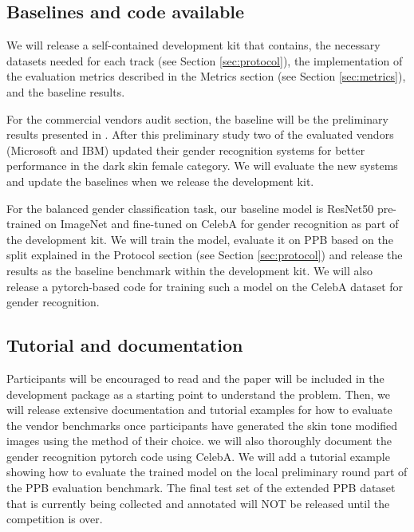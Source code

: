 \documentclass[11pt, oneside]{article}
\makeatletter
\let\@internalcite\cite
\def\cite{\def\citeauthoryear##1##2{##1, ##2}\@internalcite}
\makeatother
\begin{document}
\subsection{Baselines and code available}

We will release a self-contained development kit that contains, the necessary 
datasets needed for each track (see Section \ref{sec:protocol}), the 
implementation of the evaluation metrics described in the Metrics section (see 
Section \ref{sec:metrics}), and the baseline results.

For the commercial vendors audit section, the baseline will be the preliminary 
results presented in \cite{buolamwini2018gender}. After this preliminary study 
two of the evaluated vendors (Microsoft and IBM) updated their gender 
recognition systems for better performance in the dark skin female category. We 
will evaluate the new systems and update the baselines when we release the 
development kit.

For the balanced gender classification task, our baseline model is ResNet50 
pre-trained on ImageNet and fine-tuned on CelebA for gender recognition as part 
of the development kit. We will train the model, evaluate it on PPB based on 
the split explained in the Protocol section (see Section \ref{sec:protocol}) 
and release the results as the baseline benchmark within the development kit. 
We will also release a pytorch-based code for training such a model on the 
CelebA dataset for gender recognition.

\subsection{Tutorial and documentation}

Participants will be encouraged to read \cite{buolamwini2018gender} and the 
paper will be included in the development package as a starting point to 
understand the problem. Then, we will release extensive documentation and 
tutorial examples for how to evaluate the vendor benchmarks once participants 
have generated the skin tone modified images using the method of their choice. 
we will also thoroughly document the gender recognition pytorch code using 
CelebA. We will add a tutorial example showing how to evaluate the trained 
model on the local preliminary round part of the PPB evaluation benchmark. The 
final test set of the extended PPB dataset that is currently being collected 
and annotated will NOT be released until the competition is over.
\end{document}
